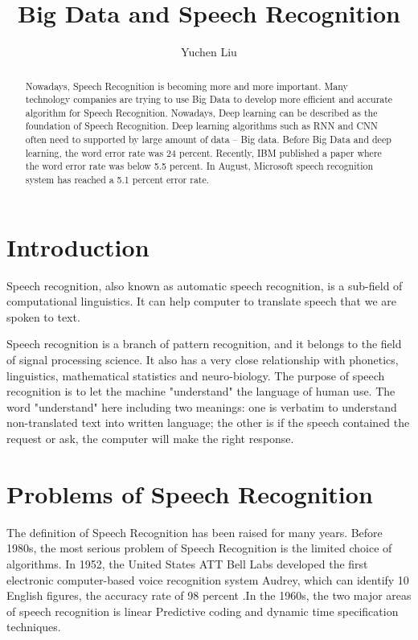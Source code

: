 \documentclass[sigconf]{acmart}
\begin{document}
\title{Big Data and Speech Recognition}


\author{Yuchen Liu}




\begin{abstract}
Nowadays, Speech Recognition is becoming more and more important. Many technology companies are trying to use Big Data to develop more efficient and accurate algorithm for Speech Recognition. Nowadays, Deep learning can be described as the foundation of Speech Recognition. Deep learning algorithms such as RNN and CNN often need to supported by large amount of data -- Big data.  Before Big Data and deep learning, the word error rate was 24 percent. Recently, IBM published a paper where the word error rate was below 5.5 percent. In August, Microsoft speech recognition system has reached a 5.1 percent error rate.
\end{abstract}



\maketitle

\section{Introduction}
Speech recognition, also known as automatic speech recognition, is a sub-field of computational linguistics. It can help computer to translate speech that we are spoken to text\citep{wiki}. 

Speech recognition is a branch of pattern recognition, and it belongs to the field of signal processing science. It also has a very close relationship with phonetics, linguistics, mathematical statistics and neuro-biology. The purpose of speech recognition is to let the machine "understand" the language of human use. The word "understand" here including two meanings: one is verbatim to understand non-translated text into written language; the other is if the speech contained the request or ask, the computer will make the right response.


\section{Problems of Speech Recognition}
The definition of Speech Recognition has been raised for many years. Before 1980s, the most serious problem of Speech Recognition is the limited choice of algorithms. In 1952, the United States ATT Bell Labs developed the first electronic computer-based voice recognition system Audrey\cite{audrey}, which can identify 10 English figures, the accuracy rate of 98 percent .In the 1960s, the two major areas of speech recognition is linear Predictive coding and dynamic time specification techniques.
\end{document}
